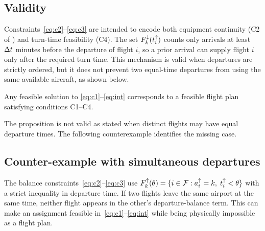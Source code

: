 \subsection{Validity}

Constraints~\eqref{eq:c2}--\eqref{eq:c3} are intended to encode both equipment
continuity (C2 of \citet{khaled2018compact}) and turn-time feasibility (C4).
The set $F^{\downarrow}_{k}(t^{\uparrow}_{i})$ counts only arrivals at least $\Delta t$ minutes before
the departure of flight $i$, so a prior arrival can supply flight $i$ only
after the required turn time. This mechanism is valid when departures are
strictly ordered, but it does not prevent two equal-time departures from using
the same available aircraft, as shown below.

\begin{proposition}
  Any feasible solution to \eqref{eq:c1}--\eqref{eq:int} corresponds to a
  feasible flight plan satisfying conditions C1--C4.
\end{proposition}

The proposition is not valid as stated when distinct flights may have equal
departure times. The following counterexample identifies the missing case.

\subsection{Counter-example with simultaneous departures}

The balance constraints~\eqref{eq:c2}--\eqref{eq:c3} use
$F^{\uparrow}_{k}(\theta)=\{i\in\mathcal{F}:a^{\uparrow}_{i}=k,\;t^{\uparrow}_{i}<\theta\}$ with a strict
inequality in departure time. If two flights leave the same airport at the
same time, neither flight appears in the other's departure-balance term.
This can make an assignment feasible in~\eqref{eq:c1}--\eqref{eq:int} while
being physically impossible as a flight plan.


